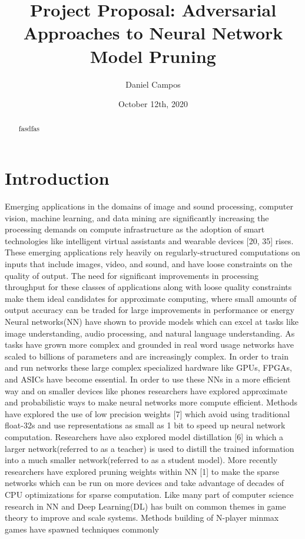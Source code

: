 \documentclass{article}
\title{Project Proposal: Adversarial Approaches to Neural Network Model Pruning}
\author{Daniel Campos}
\date{October 12th, 2020}
\begin{document}
\maketitle
\begin{abstract}
    fasdfas
\end{abstract}
\section{Introduction}
Emerging applications in the domains of image and sound processing, computer vision, machine learning, and data mining are significantly increasing
the processing demands on compute infrastructure as the adoption of smart
technologies like intelligent virtual assistants  and wearable devices
[20, 35] rises. These emerging applications rely heavily on regularly-structured
computations on inputs that include images, video, and sound, and have loose
constraints on the quality of output. The need for significant improvements in
processing throughput for these classes of applications along with loose quality constraints make them ideal candidates for approximate computing, where
small amounts of output accuracy can be traded for large improvements in performance or energy
Neural networks(NN) have shown to provide models which can excel at tasks
like image understanding, audio processing, and natural language understanding. As tasks have grown more complex and grounded in real word usage networks have scaled to billions of parameters and are increasingly complex. In
order to train and run networks these large complex specialized hardware like
GPUs, FPGAs, and ASICs have become essential. In order to use these NNs in
a more efficient way and on smaller devices like phones researchers have explored
approximate and probabilistic ways to make neural networks more compute efficient. Methods have explored the use of low precision weights [7] which avoid
using traditional float-32s and use representations as small as 1 bit to speed
up neural network computation. Researchers have also explored model distillation [6] in which a larger network(referred to as a teacher) is used to distill
the trained information into a much smaller network(referred to as a student
model). More recently researchers have explored pruning weights within NN
[1] to make the sparse networks which can be run on more devices and take
advantage of decades of CPU optimizations for sparse computation.
Like many part of computer science research in NN and Deep Learning(DL) has
built on common themes in game theory to improve and scale systems. Methods building of N-player minmax games have spawned techniques commonly
\end{document}
